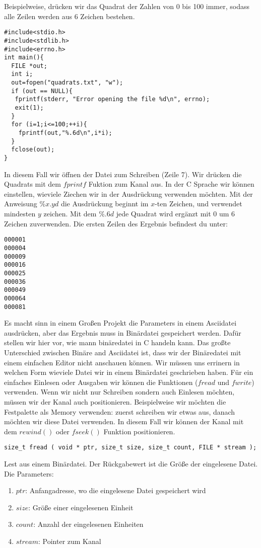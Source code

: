 \documentclass{article}[12pt]
\newenvironment{myexampleblock}[1]{%
    \tcolorbox[beamer,%
    noparskip,breakable,
    colback=White,colframe=ForestGreen,%
    colbacklower=LimeGreen!75!White,%
    title=#1]}%
    {\endtcolorbox}
\begin{document}
Beispielweise, drücken wir das Quadrat der Zahlen von 0 bis 100 immer, sodass alle Zeilen werden
aus 6 Zeichen bestehen.
\begin{lstlisting}
#include<stdio.h>
#include<stdlib.h>
#include<errno.h>
int main(){
  FILE *out;
  int i;
  out=fopen("quadrats.txt", "w");
  if (out == NULL){
   fprintf(stderr, "Error opening the file %d\n", errno);
   exit(1);
  }
  for (i=1;i<=100;++i){
    fprintf(out,"%.6d\n",i*i);
  }
  fclose(out);
}
\end{lstlisting}
In diesem Fall wir öffnen der Datei zum Schreiben (Zeile 7). Wir drücken 
die Quadrats mit dem $fprintf$ Fuktion zum Kanal aus. In der C Sprache wir 
können einstellen, wieviele Ziechen wir in der Ausdrückung verwenden möchten. 
Mit der Anweisung $\%x.yd$ die Ausdrückung beginnt im $x$-ten Zeichen, und 
verwendet mindesten $y$ zeichen. Mit dem $\%.6d$ jede Quadrat wird ergänzt mit $0$
um 6 Zeichen zuverwenden. Die ersten Zeilen des Ergebnis befindest du unter:
\begin{lstlisting}
000001
000004
000009
000016
000025
000036
000049
000064
000081
\end{lstlisting}
Es macht sinn in einem Großen Projekt die Parameters in einem Asciidatei ausdrücken, aber
das Ergebnis muss in Binärdatei gespeichert werden. Dafür stellen wir hier vor, wie 
mann binäredatei in C handeln kann. Das großte Unterschied zwischen Binäre and Asciidatei
ist, dass wir der Binäredatei mit einem einfachen Editor nicht anschauen können. Wir müssen uns
errinern in welchen Form wieviele Datei wir in einem Binärdatei geschrieben haben. Für ein einfaches 
Einlesen oder Ausgaben wir können die Funktionen ($fread$ und $fwrite$) verwenden. Wenn wir nicht nur
Schreiben sondern auch Einlesen möchten, müssen wir der Kanal auch positionieren.  Beispielweise
wir möchten die Festpalette als Memory verwenden: zuerst schreiben wir etwas aus, danach möchten
wir diese Datei verwenden. In diesem Fall wir können der Kanal mit dem $rewind()$ oder $fseek()$ Funktion
positionieren.
\begin{myexampleblock}{Funktion: \texttt{fread}}
\begin{lstlisting}
size_t fread ( void * ptr, size_t size, size_t count, FILE * stream );
\end{lstlisting}
\vspace{-0.4cm}
Lest aus einem Binärdatei. Der Rückgabewert ist die Größe der eingelesene Datei.\\
Die Parameters:
\begin{enumerate}
\item $ptr$: Anfangadresse, wo die eingelesene Datei gespeichert wird
\item $size$: Größe einer eingelesenen Einheit
\item $count$: Anzahl der eingelesenen Einheiten
\item $stream$: Pointer zum Kanal
\end{enumerate}
\end{myexampleblock}
\end{document}
